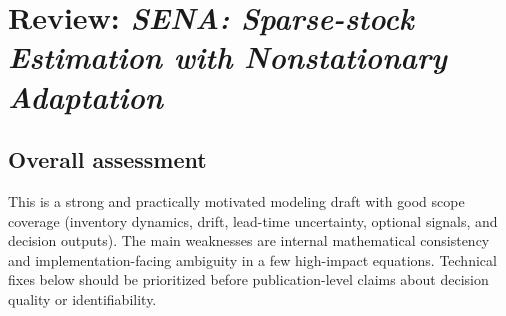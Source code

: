 \documentclass[11pt]{article}
\begin{document}
\section*{Review: \textit{SENA: Sparse-stock Estimation with Nonstationary Adaptation}}

\subsection*{Overall assessment}
This is a strong and practically motivated modeling draft with good scope coverage (inventory dynamics, drift, lead-time uncertainty, optional signals, and decision outputs). The main weaknesses are internal mathematical consistency and implementation-facing ambiguity in a few high-impact equations. Technical fixes below should be prioritized before publication-level claims about decision quality or identifiability.
\end{document}
